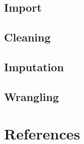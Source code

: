 \documentclass[
  letterpaper,
  DIV=11,
  numbers=noendperiod]{scrreprt}
\newlength{\cslhangindent}
\newlength{\cslentryspacingunit} %
\newenvironment{CSLReferences}[2] %
 {%
  \setlength{\parindent}{0pt}
  \ifodd #1
  \let\oldpar\par
  \def\par{\hangindent=\cslhangindent\oldpar}
  \fi
  \setlength{\parskip}{#2\cslentryspacingunit}
 }%
 {}
\begin{document}
\hypertarget{import-1}{%
\section{Import}\label{import-1}}

\hypertarget{cleaning-1}{%
\section{Cleaning}\label{cleaning-1}}

\hypertarget{imputation-1}{%
\section{Imputation}\label{imputation-1}}

\hypertarget{wrangling-1}{%
\section{Wrangling}\label{wrangling-1}}


\hypertarget{references}{%
\chapter*{References}\label{references}}


\hypertarget{refs}{}
\begin{CSLReferences}{0}{0}
\end{CSLReferences}
\end{document}
